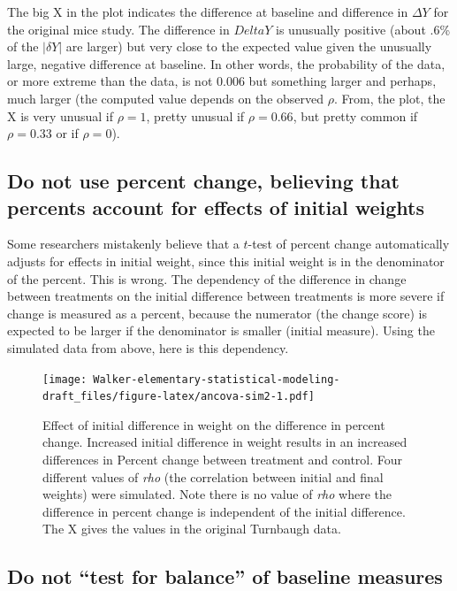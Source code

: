\documentclass[]{book}
\begin{document}
The big X in the plot indicates the difference at baseline and
difference in \(\Delta Y\) for the original mice study. The difference
in \(Delta Y\) is unusually positive (about .6\% of the \(|\delta Y|\)
are larger) but very close to the expected value given the unusually
large, negative difference at baseline. In other words, the probability
of the data, or more extreme than the data, is not 0.006 but something
larger and perhaps, much larger (the computed value depends on the
observed \(\rho\). From, the plot, the X is very unusual if \(\rho=1\),
pretty unusual if \(\rho=0.66\), but pretty common if \(\rho=0.33\) or
if \(\rho=0\)).

\subsection{Do not use percent change, believing that percents account
for effects of initial
weights}\label{do-not-use-percent-change-believing-that-percents-account-for-effects-of-initial-weights}

Some researchers mistakenly believe that a \(t\)-test of percent change
automatically adjusts for effects in initial weight, since this initial
weight is in the denominator of the percent. This is wrong. The
dependency of the difference in change between treatments on the initial
difference between treatments is more severe if change is measured as a
percent, because the numerator (the change score) is expected to be
larger if the denominator is smaller (initial measure). Using the
simulated data from above, here is this dependency.

\begin{figure}
\centering
\texttt{[image: Walker-elementary-statistical-modeling-draft\_files/figure-latex/ancova-sim2-1.pdf]}
\caption{\label{fig:ancova-sim2}Effect of initial difference in weight on
the difference in percent change. Increased initial difference in weight
results in an increased differences in Percent change between treatment
and control. Four different values of \emph{rho} (the correlation
between initial and final weights) were simulated. Note there is no
value of \emph{rho} where the difference in percent change is
independent of the initial difference. The X gives the values in the
original Turnbaugh data.}
\end{figure}

\subsection{\texorpdfstring{Do not ``test for balance'' of baseline
measures}{Do not test for balance of baseline measures}}\label{do-not-test-for-balance-of-baseline-measures}
\end{document}

